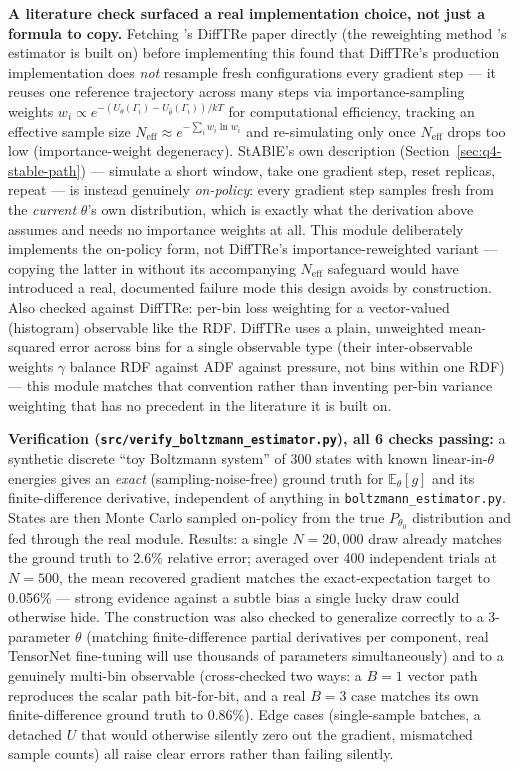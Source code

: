\documentclass[11pt]{article}
\begin{document}
\textbf{A literature check surfaced a real implementation choice, not just
a formula to copy.} Fetching \citet{thaler2021difftre}'s DiffTRe paper
directly (the reweighting method \citeauthor{raja2025stable}'s estimator is
built on) before implementing this found that DiffTRe's production
implementation does \emph{not} resample fresh configurations every gradient
step --- it reuses one reference trajectory across many steps via
importance-sampling weights $w_i \propto e^{-(U_\theta(\Gamma_i)-U_{\hat\theta}(\Gamma_i))/kT}$
for computational efficiency, tracking an effective sample size
$N_{\text{eff}}\approx e^{-\sum_i w_i \ln w_i}$ and re-simulating only once
$N_{\text{eff}}$ drops too low (importance-weight degeneracy). StABlE's own
description (Section~\ref{sec:q4-stable-path}) --- simulate a short window,
take one gradient step, reset replicas, repeat --- is instead genuinely
\emph{on-policy}: every gradient step samples fresh from the
\emph{current} $\theta$'s own distribution, which is exactly what the
derivation above assumes and needs no importance weights at all. This
module deliberately implements the on-policy form, not DiffTRe's
importance-reweighted variant --- copying the latter in without its
accompanying $N_{\text{eff}}$ safeguard would have introduced a real,
documented failure mode this design avoids by construction. Also checked
against DiffTRe: per-bin loss weighting for a vector-valued (histogram)
observable like the RDF. DiffTRe uses a plain, unweighted mean-squared
error across bins for a single observable type (their inter-observable
weights $\gamma$ balance RDF against ADF against pressure, not bins within
one RDF) --- this module matches that convention rather than inventing
per-bin variance weighting that has no precedent in the literature it is
built on.

\textbf{Verification (\texttt{src/verify\_boltzmann\_estimator.py}), all 6
checks passing:} a synthetic discrete ``toy Boltzmann system'' of 300
states with known linear-in-$\theta$ energies gives an \emph{exact}
(sampling-noise-free) ground truth for $\mathbb{E}_\theta[g]$ and its
finite-difference derivative, independent of anything in
\texttt{boltzmann\_estimator.py}. States are then Monte Carlo sampled
on-policy from the true $P_{\theta_0}$ distribution and fed through the
real module. Results: a single $N{=}20{,}000$ draw already matches the
ground truth to 2.6\% relative error; averaged over 400 independent trials
at $N{=}500$, the mean recovered gradient matches the exact-expectation
target to 0.056\% --- strong evidence against a subtle bias a single lucky
draw could otherwise hide. The construction was also checked to generalize
correctly to a 3-parameter $\theta$ (matching finite-difference partial
derivatives per component, real TensorNet fine-tuning will use thousands of
parameters simultaneously) and to a genuinely multi-bin observable
(cross-checked two ways: a $B{=}1$ vector path reproduces the scalar path
bit-for-bit, and a real $B{=}3$ case matches its own finite-difference
ground truth to 0.86\%). Edge cases (single-sample batches, a detached $U$
that would otherwise silently zero out the gradient, mismatched sample
counts) all raise clear errors rather than failing silently.
\end{document}
